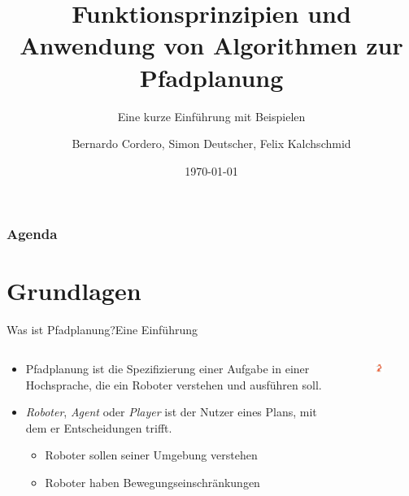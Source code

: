 \documentclass[t,aspectratio=169,dvipsnames]{beamer}
\title{Funktionsprinzipien und Anwendung von Algorithmen zur Pfadplanung}
\subtitle{Eine kurze Einführung mit Beispielen}
\author{Bernardo Cordero, Simon Deutscher, Felix Kalchschmid}							%
\institute{Hochschule Trier}
\date{\today}
\begin{document}
\begin{frame}
\titlepage
\end{frame}

\begin{frame}
\frametitle{Agenda}
\tableofcontents
\end{frame}

\section{Grundlagen}

\begin{frame}{Was ist Pfadplanung?}{Eine Einführung}
	\begin{columns}[T]
		\begin{column}[T]{0.6\textwidth}
		\begin{itemize}
		\item Pfadplanung ist die Spezifizierung einer Aufgabe in einer Hochsprache, die ein Roboter verstehen und ausführen soll.
		\newline\newline
		\item \textit{Roboter}, \textit{Agent} oder \textit{Player} ist der Nutzer eines Plans, mit dem er Entscheidungen trifft.
	
		\begin{itemize}
		\item Roboter sollen seiner Umgebung verstehen
		\item Roboter haben Bewegungseinschränkungen
		\end{itemize}
		\end{itemize}
		\end{column}
		\begin{column}[T]{0.4\textwidth}
			\begin{figure}
			\includegraphics[width=2.5cm]{images/Bild1.png}
		\end{figure}
		\end{column}
	\end{columns}
\end{frame}
\end{document}
